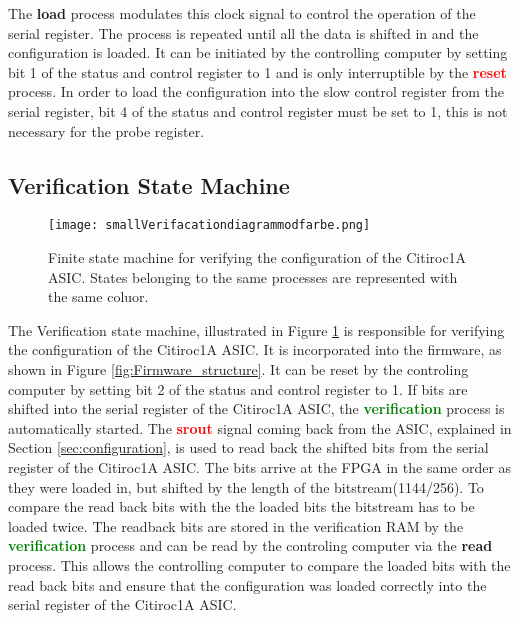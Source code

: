 The \textbf{\textcolor{VioletRed}{load}} process modulates this clock signal to control the operation of the serial register.
\newline
The process is repeated until all the data is shifted in and the configuration is loaded.
It can be initiated by the controlling computer by setting bit 1 of the status and control register to 1 and is only interruptible by the \textbf{\textcolor{red}{reset}} process.
\newline
In order to load the configuration into the slow control register from the serial register, bit 4 of the status and control register must be set to 1, this is not necessary for the probe register.

\subsection{Verification State Machine}
\begin{figure}[H]
    \centering
    \texttt{[image: smallVerifacationdiagrammodfarbe.png]}%
    \caption{Finite state machine for verifying the configuration of the Citiroc1A ASIC.
    States belonging to the same processes are represented with the same coluor.}
    \label{fig:Verification_state_machine}
\end{figure}
The Verification state machine, illustrated in Figure \ref{fig:Verification_state_machine} is responsible for verifying the configuration of the Citiroc1A ASIC.
It is incorporated into the firmware, as shown in Figure \ref{fig:Firmware_structure}.
\newline
It can be reset by the controling computer by setting bit 2 of the status and control register to 1.
\newline
If bits are shifted into the serial register of the Citiroc1A ASIC, the \textbf{\textcolor{green}{verification}} process is automatically started.
The \textbf{\textcolor{red}{srout}} signal coming back from the ASIC, explained in Section \ref{sec:configuration}, is used to read back the shifted bits from the serial register of the Citiroc1A ASIC.
The bits arrive at the FPGA in the same order as they were loaded in, but shifted by the length of the bitstream(1144/256). To compare the read back bits with the the loaded bits the bitstream has to be loaded twice.
\newline
The readback bits are stored in the verification RAM by the \textbf{\textcolor{green}{verification}} process and can be read by the controling computer via the  \textbf{\textcolor{yellow!60!black}{read}} process.
This allows the controlling computer to compare the loaded bits with the read back bits and ensure that the configuration was loaded correctly into the serial register of the Citiroc1A ASIC.
